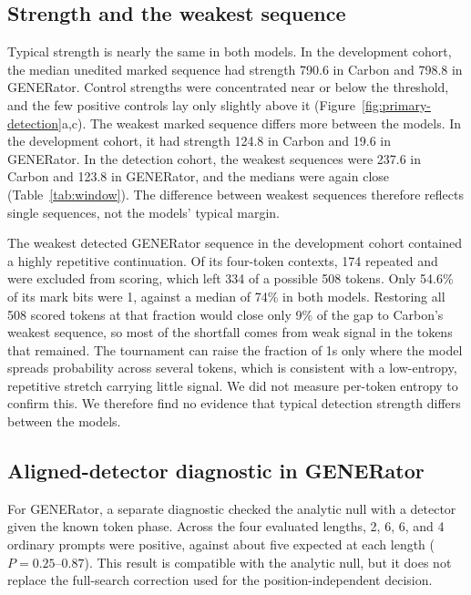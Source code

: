 \documentclass[10pt,twocolumn]{article}
\begin{document}
\subsection{Strength and the weakest sequence}
\label{supp:weakest}

Typical strength is nearly the same in both models. In the development cohort, the median unedited
marked sequence had strength 790.6 in Carbon and 798.8 in GENERator. Control strengths were
concentrated near or below the threshold, and the few positive controls lay only slightly above it
(Figure~\ref{fig:primary-detection}a,c). The weakest marked sequence differs more between the models.
In the development cohort, it had strength 124.8 in Carbon and 19.6 in GENERator. In the detection
cohort, the weakest sequences were 237.6 in Carbon and 123.8 in GENERator, and the medians were again close
(Table~\ref{tab:window}). The difference between weakest sequences therefore reflects single sequences, not
the models' typical margin.

The weakest detected GENERator sequence in the development cohort contained a highly repetitive
continuation. Of its
four-token contexts, 174 repeated and were excluded from scoring, which left 334 of a possible 508
tokens. Only 54.6\% of its mark bits were 1, against a median of 74\% in both models. Restoring all
508 scored tokens at that fraction would close only 9\% of the gap to Carbon's weakest sequence, so most
of the shortfall comes from weak signal in the tokens that remained. The tournament can raise the
fraction of 1s only where the model spreads probability across several tokens, which is consistent
with a low-entropy, repetitive stretch carrying little signal. We did not measure per-token entropy
to confirm this. We therefore find no evidence that typical detection strength differs between the
models.

\subsection{Aligned-detector diagnostic in GENERator}
\label{supp:aligned}

For GENERator, a separate diagnostic checked the analytic null with a detector given the known
token phase. Across the four evaluated lengths, 2, 6, 6, and 4 ordinary prompts were positive,
against about five expected at each length ($P = 0.25$--$0.87$). This result is compatible with
the analytic null, but it does not replace the full-search correction used for the
position-independent decision.
\end{document}
